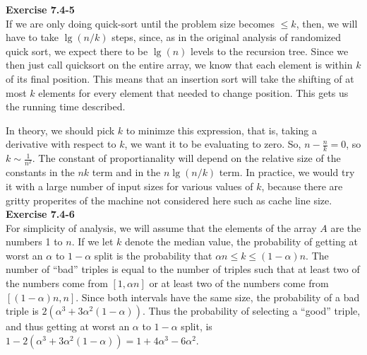 \documentclass{article}
\begin{document}
\noindent\textbf{Exercise 7.4-5}\\

If we are only doing quick-sort until the problem size becomes $\le k$, then, we will have to take $\lg(n/k)$ steps, since, as in the original analysis of randomized quick sort, we expect there to be $\lg(n)$ levels to the recursion tree. Since we then just call quicksort on the entire array, we know that each element is within $k$ of its final position. This means that an insertion sort will take the shifting of at most $k$ elements for every element that needed to change position. This gets us the running time described.

In theory, we should pick $k$ to minimze this expression, that is, taking a derivative with respect to $k$, we want it to be evaluating to zero. So, $n - \frac{n}{k} =0$, so $k \sim \frac{1}{n^2} $. The constant of proportianality will depend on the relative size of the constants in the $nk$ term and in the $n\lg(n/k)$ term. In practice, we would try it with a large number of input sizes for various values of $k$, because there are gritty properites of the machine not considered here such as cache line size.
\\

\noindent\textbf{Exercise 7.4-6}\\

For simplicity of analysis, we will assume that the elements of the array $A$ are the numbers 1 to $n$.  If we let $k$ denote the median value, the probability of getting at worst an $\alpha$ to $1-\alpha$ split is the probability that $\alpha n \leq k \leq (1-\alpha)n$.  The number of ``bad'' triples is equal to the number of triples such that at least two of the numbers come from $[1,\alpha n]$ or at least two of the numbers come from $[(1-\alpha)n, n]$.  Since both intervals have the same size, the probability of a bad triple is $2(\alpha^3 +3\alpha^2(1-\alpha))$.  Thus the probability of selecting a ``good'' triple, and thus getting at worst an $\alpha$ to $1-\alpha$ split, is $1 - 2(\alpha^3 +3\alpha^2(1-\alpha)) = 1 + 4\alpha^3 - 6\alpha^2$.
\end{document}
